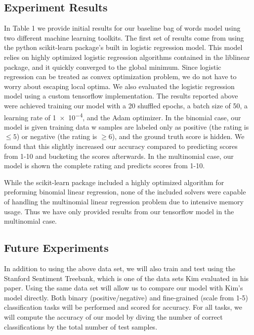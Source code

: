 \documentclass[conference]{IEEEtran}
\begin{document}
\subsection{Experiment Results}
    In Table 1 we provide initial results for our baseline bag of words model using
    two different machine learning toolkits. The first set of results come from
    using the python scikit-learn package's built in logistic regression model.
    This model relies on highly optimized logistic regression algorithms
    contained in the liblinear \cite{Fan:2008:LLL:1390681.1442794} package,
    and it quickly converged to the global minimum. Since logistic regression
    can be treated as convex optimization problem, we do not have to worry 
    about escaping local optima. We also evaluated the logistic regression
    model using a custom tensorflow implementation. The results reported
    above were achieved training our model with a 20 shuffled epochs, a
    batch size of 50, a learning rate of \num{1e-4}, and the Adam optimizer.
    In the binomial case, our model is given training data w samples are
    labeled only as positive (the rating is $\leq 5$) or negative (the rating is
    $\geq 6$), and the ground truth score is hidden. We found that this slightly
    increased our accuracy compared to predicting scores from 1-10 and
    bucketing the scores afterwards. In the multinomial case, our model is
    shown the complete rating and predicts scores from 1-10.
    
    While the scikit-learn package included a highly optimized algorithm for
    preforming binomial linear regression, none of the included solvers were
    capable of handling the multinomial linear regression problem due to intensive
    memory usage. Thus we have only provided results from our tensorflow
    model in the multinomial case.

\subsection{Future Experiments}
    In addition to using the above data set, we will also train and test using the 
    Stanford Sentiment Treebank, which is one of the data sets Kim evaluated in 
    his paper\cite{sentimenttreebank}. Using the same data set
    will allow us to compare our model with Kim's model directly. 
    Both binary (positive/negative) and fine-grained (scale from 1-5) 
    classification tasks will be performed and scored for accuracy.
    For all tasks, we will compute the accuracy of our model by diving the 
    number of correct classifications by the total number of test samples.
    
\end{document}
